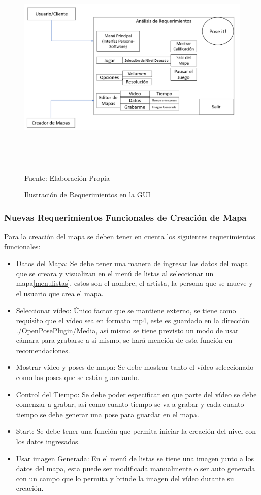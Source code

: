 \begin{figure}[t!]
	\centering
	\includegraphics[width=16cm,height=10cm,]{./Images/requerimientosposeit.png}
	\caption{Ilustración de Requerimientos en la GUI}
	\footnotesize Fuente: Elaboración Propia
	\label{requerimientosgrafico2}
\end{figure}

\subsubsection{Nuevas Requerimientos Funcionales de Creación de Mapa}

Para la creación del mapa se deben tener en cuenta los siguientes requerimientos funcionales:

\begin{itemize}
	\item Datos del Mapa: Se debe tener una manera de ingresar los datos del mapa que se creara y visualizan en el menú de listas al seleccionar un mapa\ref{menulistas}, estos son el nombre, el artista, la persona que se mueve y el usuario que crea el mapa.
	\item Seleccionar vídeo: Único factor que se mantiene externo, se tiene como requisito que el vídeo sea en formato mp4, este es guardado en la dirección ./OpenPosePlugin/Media, así mismo se tiene previsto un modo de usar cámara para grabarse a si mismo, se hará mención de esta función en recomendaciones.
	\item Mostrar vídeo y poses de mapa: Se debe mostrar tanto el vídeo seleccionado como las poses que se están guardando.
	\item Control del Tiempo: Se debe poder especificar en que parte del vídeo se debe comenzar a grabar, así como cuanto tiempo se va a grabar y cada cuanto tiempo se debe generar una pose para guardar en el mapa. 
	\item Start: Se debe tener una función que permita iniciar la creación del nivel con los datos ingresados.
	\item Usar imagen Generada: En el menú de listas se tiene una imagen junto a los datos del mapa, esta puede ser modificada manualmente o ser auto generada con un campo que lo permita y brinde la imagen del vídeo durante su creación.
\end{itemize}

